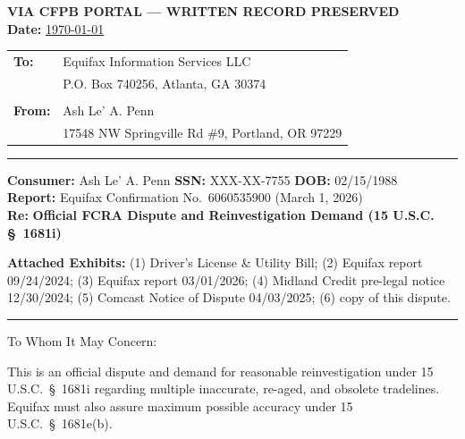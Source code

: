\documentclass[12pt,letterpaper]{article}
\begin{document}
\begin{center}
  \textbf{VIA CFPB PORTAL --- WRITTEN RECORD PRESERVED} \\
  \textbf{Date:} \underline{\today}
\end{center}

\begin{tabular}{@{}ll}
  \textbf{To:}   & Equifax Information Services LLC \\
                 & P.O. Box 740256, Atlanta, GA 30374 \\
                 & \\
  \textbf{From:} & Ash Le' A. Penn \\
                 & 17548 NW Springville Rd \#9, Portland, OR 97229 \\
\end{tabular}

\vspace{1em}\hrule\vspace{1em}

\textbf{Consumer:} Ash Le' A. Penn \quad \textbf{SSN:} XXX-XX-7755 \quad \textbf{DOB:} 02/15/1988 \\
\textbf{Report:} Equifax Confirmation No.\ 6060535900 (March 1, 2026) \\
\textbf{Re:} \textbf{Official FCRA Dispute and Reinvestigation Demand (15 U.S.C. \S~1681i)}

\vspace{1em}
\textbf{Attached Exhibits:} (1) Driver's License \& Utility Bill; (2) Equifax report 09/24/2024; (3) Equifax report 03/01/2026; (4) Midland Credit pre-legal notice 12/30/2024; (5) Comcast Notice of Dispute 04/03/2025; (6) copy of this dispute.

\vspace{1em}\hrule\vspace{1em}

To Whom It May Concern:

This is an official dispute and demand for reasonable reinvestigation under 15 U.S.C.\ \S~1681i regarding multiple inaccurate, re-aged, and obsolete tradelines. Equifax must also assure maximum possible accuracy under 15 U.S.C.\ \S~1681e(b).


\end{document}

